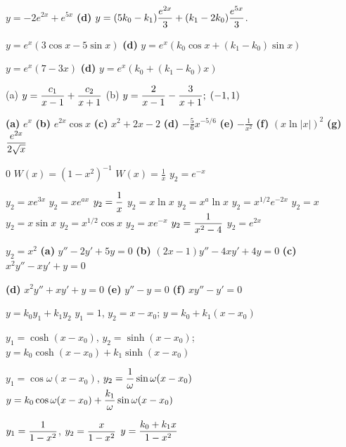 \medskip

  $y=-2e^{2x}+e^{5x}$
{\bf (d)} $y=(5k_{0}-k_{1})\displaystyle\frac{e^{2x}}{3}+(k_{1}-2k_{0})\displaystyle\frac{e^{5x}}{3}$.

 $y=e^{x}(3\cos x-5\sin x)$
{\bf (d)} $y=e^{x}\left(k_{0}\cos x+(k_{1}-k_{0})\sin x\right)$

 $y=e^{x}(7-3x)$
{\bf (d)} $y=e^{x}\left(k_{0}+(k_{1}-k_{0})x\right)$

(a) $y=\displaystyle\frac{c_{1}}{x-1}+\displaystyle\frac{c_{2}}{x+1}$
(b) $y=\displaystyle{\frac{2}{x-1}-\frac{3}{x+1}};\;(-1,1)$

{\bf (a)} $e^{x}$
 {\bf (b)} $e^{2x}\cos x$
{\bf (c)} $x^{2}+2x-2$
 {\bf (d)} $\displaystyle{-\frac{5}{6}x^{-5/6}}$
{\bf (e)} $\displaystyle{-\frac{1}{x^{2}}}$
 {\bf (f)} $(x\ln|x|)^{2}$
{\bf (g)} $\displaystyle\frac{e^{2x}}{2\sqrt{x}}$

   $0$
 $W(x)=(1-x^{2})^{-1}$
$\displaystyle{W(x)=\frac{1}{x}}$
 $y_{2}=e^{-x}$

 $y_{2}=xe^{3x}$
 $y_{2}=xe^{ax}$
 $y_{2}=\displaystyle\frac{1}{x}$
 $y_{2}=x\ln x$
 $y_{2}=x^{a}\ln x$
 $y_{2}=x^{1/2}e^{-2x}$
 $y_{2}=x$
 $y_{2}=x\sin x$
 $y_{2}=x^{1/2}\cos x$
 $y_{2}=xe^{-x}$
 $y_{2}=\displaystyle\frac{1}{x^{2}-4}$
 $y_{2}=e^{2x}$

 $y_{2}=x^{2}$
{\bf (a)} $y''-2y'+5y=0$
 {\bf (b)} $(2x-1)y''-4xy'+4y=0$
{\bf (c)} $x^{2}y''-xy'+y=0$

\quad\;  \;   {\bf (d)} $x^{2}y''+xy'+y=0$
{\bf (e)} $y''-y=0$
 {\bf (f)} $xy''-y'=0$

 $y=k_{0}y_{1}+k_{1}y_{2}$
 $y_{1}=1$,  $y_{2}=x-x_{0}$;    $y=k_{0}+k_{1}(x-x_{0})$

$y_{1}=\cosh(x-x_{0})$,
$y_{2}=\sinh(x-x_{0})$;
 $y=k_{0}\cosh(x-x_{0})+k_{1}\sinh(x-x_{0})$

$y_{1}=\cos\omega(x-x_{0})$,
$y_{2}=\displaystyle\frac{1}{\omega}\sin\omega(x-x_{0})$
 $y=k_{0}\cos\omega(x-x_{0})+\displaystyle\frac{k_{1}}{\omega}\sin\omega(x-x_{0})$

$y_{1}=\displaystyle\frac{1}{1-x^{2}}$,\; $y_{2}=\displaystyle\frac{x}{1-x^{2}}$
$y=\displaystyle\frac{k_{0}+k_{1}x}{1-x^{2}}$

